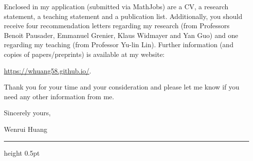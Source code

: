 \documentclass[10pt]{article}
\begin{document}
Enclosed in my application (submitted via MathJobs) are a CV, a research statement, a teaching statement and a publication list. Additionally, you should receive four recommendation letters regarding my research (from Professors Benoit Pausader, Emmanuel Grenier, Klaus Widmayer and Yan Guo) and one regarding my teaching (from Professor Yu-lin Lin). Further information (and copies of papers/preprints) is available at my website:

\url{https://whuang58.github.io/}.
 
 \medskip
Thank you for your time and your consideration and please let me know if you
need any other information from me.
 
\vspace{0.12in}
Sincerely yours,
 

Wenrui Huang
 
\vfill
\hrule height 0.5pt
 
\end{document}
